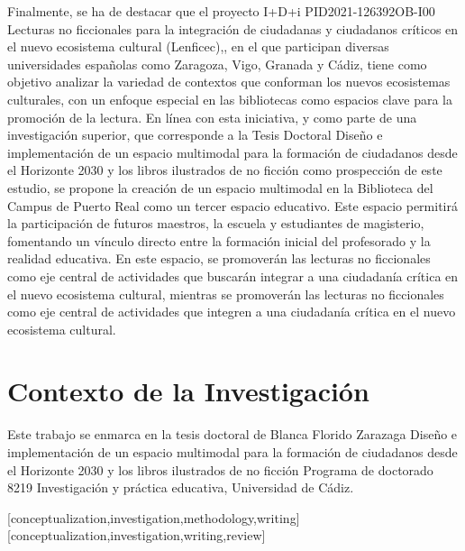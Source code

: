 \documentclass[spanish]{textolivre}
\begin{document}
Finalmente, se ha de destacar que el proyecto I+D+i PID2021-126392OB-I00 Lecturas no ficcionales para la integración de ciudadanas y ciudadanos críticos en el nuevo ecosistema cultural (Lenficec),, en el que participan diversas universidades españolas como Zaragoza, Vigo, Granada y Cádiz, tiene como objetivo analizar la variedad de contextos que conforman los nuevos ecosistemas culturales, con un enfoque especial en las bibliotecas como espacios clave para la promoción de la lectura. En línea con esta iniciativa, y como parte de una investigación superior, que corresponde a la Tesis Doctoral Diseño e implementación de un espacio multimodal para la formación de ciudadanos desde el Horizonte 2030 y los libros ilustrados de no ficción como prospección de este estudio, se propone la creación de un espacio multimodal en la Biblioteca del Campus de Puerto Real como un tercer espacio educativo. Este espacio permitirá la participación de futuros maestros, la escuela y estudiantes de magisterio, fomentando un vínculo directo entre la formación inicial del profesorado y la realidad educativa. En este espacio, se promoverán las lecturas no ficcionales como eje central de actividades que buscarán integrar a una ciudadanía crítica en el nuevo ecosistema cultural, mientras se promoverán las lecturas no ficcionales como eje central de actividades que integren a una ciudadanía crítica en el nuevo ecosistema cultural.


\section*{Contexto de la Investigación}
Este trabajo se enmarca en la tesis doctoral de Blanca Florido Zarazaga Diseño e implementación de un espacio multimodal para la formación de ciudadanos desde el Horizonte 2030 y los libros ilustrados de no ficción Programa de doctorado 8219 Investigación y práctica educativa, Universidad de Cádiz.

\printbibliography\label{sec-bib}
\begin{contributors}
[conceptualization,investigation,methodology,writing]
[conceptualization,investigation,writing,review]
\end{contributors}
\end{document}
